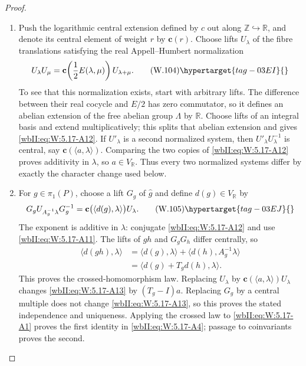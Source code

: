 \begin{proof}
\begin{enumerate}[label=\arabic*.,leftmargin=*]
\item Push the logarithmic central extension defined by \(c\) out along
\(\mathbb Z\hookrightarrow\mathbb R\), and denote its central element of
weight \(r\) by \(\mathbf c(r)\).  Choose lifts \(U_\lambda\) of the fibre
translations satisfying the real Appell--Humbert normalization
\[
 U_\lambda U_\mu
 =\mathbf c\!\left(\frac12E(\lambda,\mu)\right)U_{\lambda+\mu}.
\tag{W.104}\hypertarget{tag-03EI}{}\label{wbII:eq:W:5.17-A12}
\]
To see that this normalization exists, start with arbitrary lifts.  The
difference between their real cocycle and \(E/2\) has zero commutator, so
it defines an abelian extension of the free abelian group \(\Lambda\) by
\(\mathbb R\).  Choose lifts of an integral basis and extend
multiplicatively; this splits that abelian extension and gives \eqref{wbII:eq:W:5.17-A12}.
If \(U'_\lambda\) is a second normalized system, then
\(U'_\lambda U_\lambda^{-1}\) is central, say
\(\mathbf c(\langle a,\lambda\rangle)\).  Comparing the two copies of
\eqref{wbII:eq:W:5.17-A12} proves additivity in \(\lambda\), so
\(a\in V_{\mathbb R}\).  Thus every two normalized systems differ by exactly
the character change used below.

\item For \(g\in\pi_1(P)\), choose a lift \(G_g\) of \(\widehat g\) and define
\(d(g)\in V_{\mathbb R}\) by
\[
 G_gU_{A_g^{-1}\lambda}G_g^{-1}
 =\mathbf c\bigl(\langle d(g),\lambda\rangle\bigr)U_\lambda.
\tag{W.105}\hypertarget{tag-03EJ}{}\label{wbII:eq:W:5.17-A13}
\]
The exponent is additive in \(\lambda\): conjugate \eqref{wbII:eq:W:5.17-A12} and use
\eqref{wbII:eq:W:5.17-A11}.  The lifts of \(gh\) and \(G_gG_h\) differ centrally, so
\[
\begin{aligned}
 \langle d(gh),\lambda\rangle
 &=\langle d(g),\lambda\rangle
   +\langle d(h),A_g^{-1}\lambda\rangle\\
 &=\langle d(g)+T_gd(h),\lambda\rangle.
\end{aligned}
\]
This proves the crossed-homomorphism law.  Replacing
\(U_\lambda\) by
\(\mathbf c(\langle a,\lambda\rangle)U_\lambda\) changes \eqref{wbII:eq:W:5.17-A13} by
\((T_g-I)a\).  Replacing \(G_g\) by a central multiple does not change
\eqref{wbII:eq:W:5.17-A13}, so this proves the stated independence and uniqueness.  Applying
the crossed law to
\eqref{wbII:eq:W:5.17-A1} proves the first identity in \eqref{wbII:eq:W:5.17-A4}; passage to coinvariants
proves the second.


\end{enumerate}
\end{proof}

